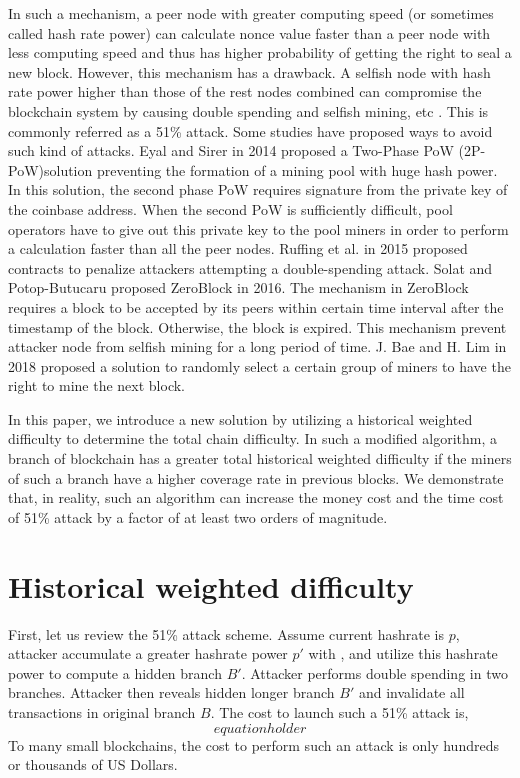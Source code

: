\documentclass[conference]{IEEEtran}
\begin{document}
In such a mechanism, a peer node with greater computing speed (or sometimes called hash rate power) can calculate nonce value faster than a peer node with less computing speed and thus has higher probability of getting the right to seal a new block. However, this mechanism has a drawback. A selfish node with hash rate power higher than those of the rest nodes combined can compromise the blockchain system by causing double spending and selfish mining, etc \cite{b3}\cite{b4}. This is commonly referred as a 51\% attack. Some studies have proposed ways to avoid such kind of attacks. Eyal and Sirer \cite{b5} in 2014 proposed a Two-Phase PoW (2P-PoW)solution preventing the formation of a mining pool with huge hash power. In this solution, the second phase PoW requires signature from the private key of the coinbase address. When the second PoW is sufficiently difficult, pool operators have to give out this private key to the pool miners in order to perform a calculation faster than all the peer nodes. Ruffing et al. \cite{b6} in 2015 proposed contracts to penalize attackers attempting a double-spending attack. Solat and Potop-Butucaru proposed ZeroBlock \cite{b7} in 2016. The mechanism in ZeroBlock requires a block to be accepted by its peers within certain time interval after the timestamp of the block. Otherwise, the block is expired. This mechanism prevent attacker node from selfish mining for a long period of time. J. Bae and H. Lim \cite{b8} in 2018 proposed a solution to randomly select a certain group of miners to have the right to mine the next block.

In this paper, we introduce a new solution by utilizing a historical weighted difficulty to determine the total chain difficulty. In such a modified algorithm, a branch of blockchain has a greater total historical weighted difficulty if the miners of such a branch have a higher coverage rate in previous blocks. We demonstrate that, in reality, such an algorithm can increase the money cost and the time cost of 51\% attack by a factor of at least two orders of magnitude.

\section{Historical weighted difficulty}
First, let us review the 51\% attack scheme. Assume current hashrate is $p$, attacker accumulate a greater hashrate power $p'$ with , and utilize this hashrate power to compute a hidden branch $B'$. Attacker performs double spending in two branches. Attacker then reveals hidden longer branch $B'$ and invalidate all transactions in original branch $B$. The cost to launch such a 51\% attack is,
\begin{equation}
equation holder\label{eq}
\end{equation}
To many small blockchains, the cost to perform such an attack is only hundreds or thousands of US Dollars.
\end{document}
